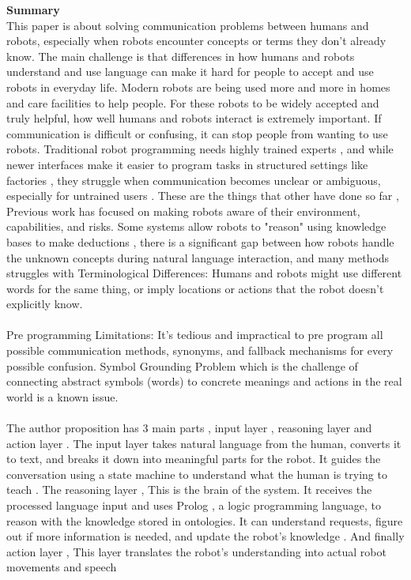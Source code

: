 \documentclass[report.tex]{subfiles}
\begin{document}
\noindent\textbf{Summary} \\
This paper is about solving communication problems between humans and robots, especially when
robots encounter concepts or terms they don't already know. The main challenge is that differences
in how humans and robots understand and use language can make it hard for people to accept and
use robots in everyday life. Modern robots are being used more and more in homes and care
facilities to help people. For these robots to be widely accepted and truly helpful, how well humans
and robots interact is extremely important. If communication is difficult or confusing, it can stop
people from wanting to use robots. Traditional robot programming needs highly trained experts ,
and while newer interfaces make it easier to program tasks in structured settings like factories , they
struggle when communication becomes unclear or ambiguous, especially for untrained users . These
are the things that other have done so far , Previous work has focused on making robots aware of
their environment, capabilities, and risks. Some systems allow robots to "reason" using knowledge
bases to make deductions , there is a significant gap between how robots handle the unknown
concepts during natural language interaction, and many methods struggles with Terminological
Differences: Humans and robots might use different words for the same thing, or imply locations or
actions that the robot doesn't explicitly know. \\\\Pre programming Limitations: It's tedious and
impractical to pre program all possible communication methods, synonyms, and fallback
mechanisms for every possible confusion. Symbol Grounding Problem which is the challenge of
connecting abstract symbols (words) to concrete meanings and actions in the real world is a known
issue.
\noindent\textbf{}\\\\The author proposition has 3 main parts , input layer , reasoning layer and action layer . The input
layer takes natural language from the human, converts it to text, and breaks it down into meaningful
parts for the robot. It guides the conversation using a state machine to understand what the human is
trying to teach . The reasoning layer , This is the brain of the system. It receives the processed
language input and uses Prolog , a logic programming language, to reason with the knowledge
stored in ontologies. It can understand requests, figure out if more information is needed, and
update the robot's knowledge . And finally action layer , This layer translates the robot's
understanding into actual robot movements and speech
\end{document}
